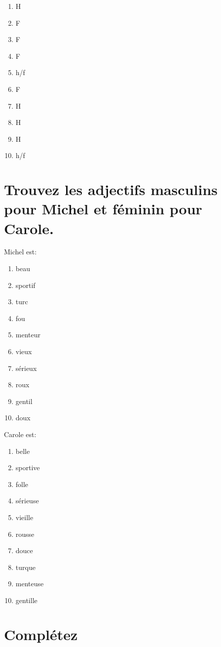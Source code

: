 \begin{enumerate}
    \item H
    \item F
    \item F
    \item F
    \item h/f
    \item F
    \item H
    \item H
    \item H
    \item h/f
\end{enumerate}

\section{Trouvez les adjectifs masculins pour Michel et féminin pour Carole.}

Michel est:
\begin{enumerate}
    \item beau 
    \item sportif
    \item turc
    \item fou
    \item menteur
    \item vieux
    \item sérieux
    \item roux
    \item gentil
    \item doux
\end{enumerate}

Carole est:
\begin{enumerate}
    \item belle
    \item sportive
    \item folle
    \item sérieuse
    \item vieille
    \item rousse
    \item douce 
    \item turque
    \item menteuse
    \item gentille
\end{enumerate}

\section{Complétez}

